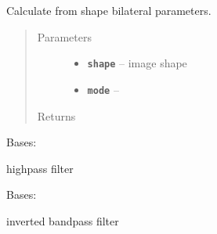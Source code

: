 \documentclass[letterpaper,10pt,english]{sphinxmanual}
\begin{document}

\begin{fulllineitems}
\label{RRtoolbox.lib.arrayops:RRtoolbox.lib.arrayops.filters.getBilateralParameters}
Calculate from shape bilateral parameters.
\begin{quote}\begin{description}
\item[{Parameters}] \leavevmode\begin{itemize}
\item {} 
\textbf{\texttt{shape}} -- image shape

\item {} 
\textbf{\texttt{mode}} -- 

\end{itemize}

\item[{Returns}] \leavevmode


\end{description}\end{quote}

\end{fulllineitems}


\begin{fulllineitems}
\label{RRtoolbox.lib.arrayops:RRtoolbox.lib.arrayops.filters.highpass}
Bases: {\hyperref[RRtoolbox.lib.arrayops:RRtoolbox.lib.arrayops.filters.FilterBase]{\emph{}}}

highpass filter

\end{fulllineitems}


\begin{fulllineitems}
\label{RRtoolbox.lib.arrayops:RRtoolbox.lib.arrayops.filters.invertedbandpass}
Bases: {\hyperref[RRtoolbox.lib.arrayops:RRtoolbox.lib.arrayops.filters.bandpass]{\emph{}}}

inverted bandpass filter

\end{fulllineitems}
\end{document}
